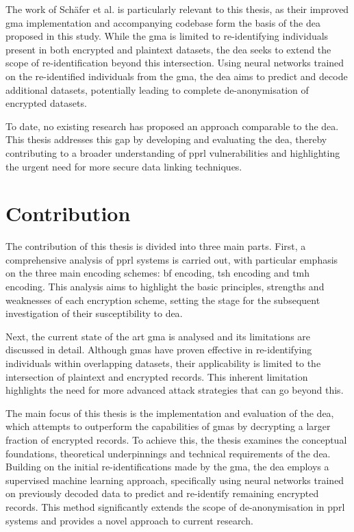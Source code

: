 The work of Schäfer et al. is particularly relevant to this thesis, as their improved \ac{gma} implementation and accompanying codebase form the basis of the \ac{dea} proposed in this study. 
While the \ac{gma} is limited to re-identifying individuals present in both encrypted and plaintext datasets, the \ac{dea} seeks to extend the scope of re-identification beyond this intersection. 
Using neural networks trained on the re-identified individuals from the \ac{gma}, the \ac{dea} aims to predict and decode additional datasets, potentially leading to complete de-anonymisation of encrypted datasets.

To date, no existing research has proposed an approach comparable to the \ac{dea}. 
This thesis addresses this gap by developing and evaluating the \ac{dea}, thereby contributing to a broader understanding of \ac{pprl} vulnerabilities and highlighting the urgent need for more secure data linking techniques.

\section{Contribution}  \label{sec:contribution}

The contribution of this thesis is divided into three main parts. 
First, a comprehensive analysis of \ac{pprl} systems is carried out, with particular emphasis on the three main encoding schemes: \ac{bf} encoding, \ac{tsh} encoding and \ac{tmh} encoding. 
This analysis aims to highlight the basic principles, strengths and weaknesses of each encryption scheme, setting the stage for the subsequent investigation of their susceptibility to \ac{dea}.

Next, the current state of the art \ac{gma} is analysed and its limitations are discussed in detail. 
Although \ac{gma}s have proven effective in re-identifying individuals within overlapping datasets, their applicability is limited to the intersection of plaintext and encrypted records. 
This inherent limitation highlights the need for more advanced attack strategies that can go beyond this.

The main focus of this thesis is the implementation and evaluation of the \ac{dea}, which attempts to outperform the capabilities of \ac{gma}s by decrypting a larger fraction of encrypted records. 
To achieve this, the thesis examines the conceptual foundations, theoretical underpinnings and technical requirements of the \ac{dea}. 
Building on the initial re-identifications made by the \ac{gma}, the \ac{dea} employs a supervised machine learning approach, specifically using neural networks trained on previously decoded data to predict and re-identify remaining encrypted records. 
This method significantly extends the scope of de-anonymisation in \ac{pprl} systems and provides a novel approach to current research.

